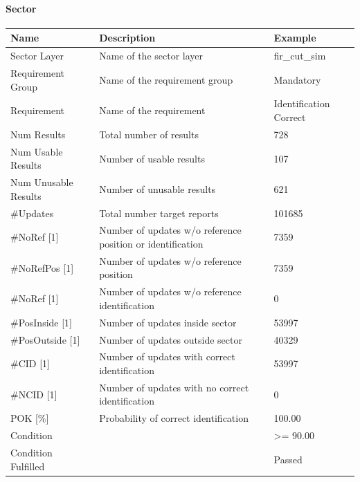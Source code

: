 \paragraph{Sector}

\begin{center}
 \begin{table}[H]
  \begin{tabularx}{\textwidth}{ | l | X |  l | }
    \hline
    \textbf{Name} & \textbf{Description} & \textbf{Example} \\ \hline
    Sector Layer & Name of the sector layer & fir\_cut\_sim \\ \hline
    Requirement Group & Name of the requirement group & Mandatory \\ \hline
    Requirement & Name of the requirement & Identification Correct \\ \hline
    Num Results & Total number of results & 728 \\ \hline
    Num Usable Results & Number of usable results & 107 \\ \hline
    Num Unusable Results & Number of unusable results & 621 \\ \hline
    \#Updates & Total number target reports & 101685 \\ \hline
    \#NoRef [1] & Number of updates w/o reference position or identification & 7359 \\ \hline
    \#NoRefPos [1] & Number of updates w/o reference position  & 7359 \\ \hline
    \#NoRef [1] & Number of updates w/o reference identification & 0 \\ \hline
    \#PosInside [1] & Number of updates inside sector & 53997 \\ \hline
    \#PosOutside [1] & Number of updates outside sector & 40329 \\ \hline
    \#CID [1] & Number of updates with correct identification & 53997 \\ \hline
    \#NCID [1] & Number of updates with no correct identification & 0 \\ \hline
    POK [\%] & Probability of correct identification & 100.00 \\ \hline
    Condition &  & >= 90.00 \\ \hline
    Condition Fulfilled &  & Passed \\ \hline
\end{tabularx}
\end{table}
\end{center}

